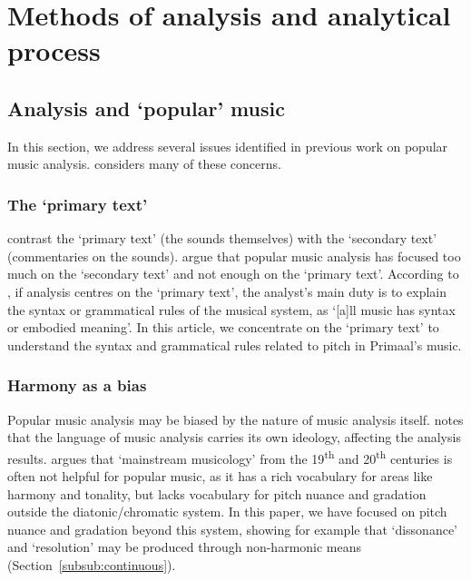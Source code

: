 \documentclass{article}
\begin{document}





\section{Methods of analysis and analytical process}
\label{sec:methods-of-analysis}

\subsection{Analysis and `popular' music}\label{ref:analysisofpopularmusic}

In this section, we address several issues identified in previous work on popular music analysis. \citet{wicke2003popmusik} considers many of these concerns.

\subsubsection{The `primary text'}\label{ref:primarytext}

\citet[p.~1]{moore2018rock} contrast the `primary text' (the sounds themselves) with the `secondary text' (commentaries on the sounds). \citeauthor{moore2018rock} argue that popular music analysis has focused too much on the `secondary text' and not enough on the `primary text'. According to \citet[p.~338]{keil1966motion}, if analysis centres on the `primary text', the analyst's main duty is to explain the syntax or grammatical rules of the musical system, as `[a]ll music has syntax or embodied meaning'. In this article, we concentrate on the `primary text' to understand the syntax and grammatical rules related to pitch in Primaal's music.


\subsubsection{Harmony as a bias}

Popular music analysis may be biased by the nature of music analysis itself. \citet[p.~19]{brackett2023interpreting} notes that the language of music analysis carries its own ideology, affecting the analysis results. \citet[pp.~104--105]{middleton1990studying} argues that `mainstream musicology' from the 19\textsuperscript{th} and 20\textsuperscript{th} centuries is often not helpful for popular music, as it has a rich vocabulary for areas like harmony and tonality, but lacks vocabulary for pitch nuance and gradation outside the diatonic/chromatic system. In this paper, we have focused on pitch nuance and gradation beyond this system, showing for example that `dissonance' and `resolution' may be produced through non-harmonic means (Section~\ref{subsub:continuous}).
\end{document}
